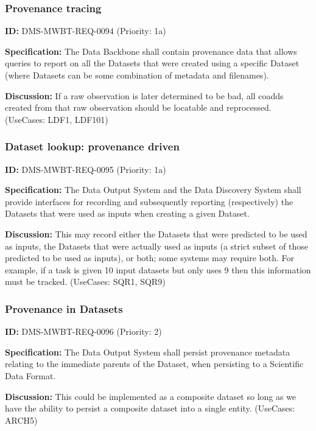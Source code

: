 \documentclass[SE,toc,lsstdraft]{lsstdoc}
\begin{document}
\subsubsection{Provenance tracing}

\label{DMS-MWBT-REQ-0094}
\textbf{ID:} DMS-MWBT-REQ-0094 (Priority: 1a)

\textbf{Specification:}
The Data Backbone shall contain provenance data that allows queries to report on all the Datasets that were created using a specific Dataset (where Datasets can be some combination of metadata and filenames).

\textbf{Discussion:}
If a raw observation is later determined to be bad, all coadds created from that raw observation should be locatable and reprocessed. (UseCases: LDF1, LDF101)

\subsubsection{Dataset lookup: provenance driven}

\label{DMS-MWBT-REQ-0095}
\textbf{ID:} DMS-MWBT-REQ-0095 (Priority: 1a)

\textbf{Specification:}
The Data Output System and the Data Discovery System shall provide interfaces for recording and subsequently reporting (respectively) the Datasets that were used as inputs when creating a given Dataset.

\textbf{Discussion:}
This may record either the Datasets that were predicted to be used as inputs, the Datasets that were actually used as inputs (a strict subset of those predicted to be used as inputs), or both; some systems may require both. For example, if a task is given 10 input datasets but only uses 9 then this information must be tracked.  (UseCases: SQR1, SQR9)

\subsubsection{Provenance in Datasets}

\label{DMS-MWBT-REQ-0096}
\textbf{ID:} DMS-MWBT-REQ-0096 (Priority: 2)

\textbf{Specification:}
The Data Output System shall persist provenance metadata relating to the immediate parents of the Dataset, when persisting to a Scientific Data Format.

\textbf{Discussion:}
This could be implemented as a composite dataset so long as we have the ability to persist a composite dataset into a single entity. (UseCases: ARCH5)
\end{document}
